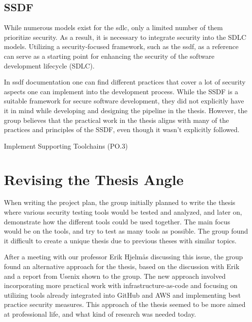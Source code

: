 \subsection{SSDF}
While numerous models exist for the \acrlong{sdlc}, only a limited number of them prioritize security. As a result, it is necessary to integrate security into the SDLC models. Utilizing a security-focused framework, such as the \acrshort{ssdf}, as a reference can serve as a starting point for enhancing the security of the software development lifecycle (SDLC). 

In \acrshort{ssdf} documentation one can find different practices that cover a lot of security aspects one can implement into the development process. While the SSDF is a suitable framework for secure software development, they did not explicitly have it in mind while developing and designing the pipeline in the thesis. However, the group believes that the practical work in the thesis aligns with many of the practices and principles of the SSDF, even though it wasn't explicitly followed. 

Implement Supporting Toolchains (PO.3)





\section{Revising the Thesis Angle}
When writing the project plan, the group initially planned to write the thesis where various security testing tools would be tested and analyzed, and later on, demonstrate how the different tools could be used together. The main focus would be on the tools, and try to test as many tools as possible. The group found it difficult to create a unique thesis due to previous theses with similar topics. 

After a meeting with our professor Erik Hjelmås discussing this issue, the group found an alternative approach for the thesis, based on the discussion with Erik and a report from Usenix \cite{usenixreport} shown to the group. The new approach involved incorporating more practical work with infrastructure-as-code and focusing on utilizing tools already integrated into GitHub and AWS and implementing best practice security measures. This approach of the thesis seemed to be more aimed at professional life, and what kind of research was needed today.  


